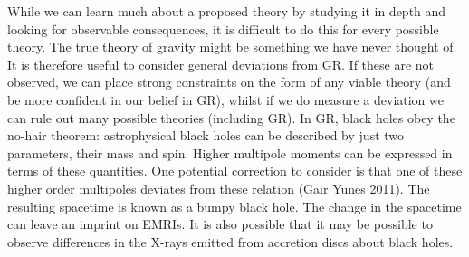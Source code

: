 While we can learn much about a proposed theory by studying it in depth and looking for observable consequences, it is difficult to do this for every possible theory. The true theory of gravity might be something we have never thought of. It is therefore useful to consider general deviations from GR. If these are not observed, we can place strong constraints on the form of any viable theory (and be more confident in our belief in GR), whilst if we do measure a deviation we can rule out many possible theories (including GR). In GR, black holes obey the no-hair theorem: astrophysical black holes can be described by just two parameters, their mass and spin. Higher multipole moments can be expressed in terms of these quantities. One potential correction to consider is that one of these higher order multipoles deviates from these relation (Gair  Yunes 2011). The resulting spacetime is known as a bumpy black hole. The change in the spacetime can leave an imprint on EMRIs. It is also possible that it may be possible to observe differences in the X-rays emitted from accretion discs about black holes.

